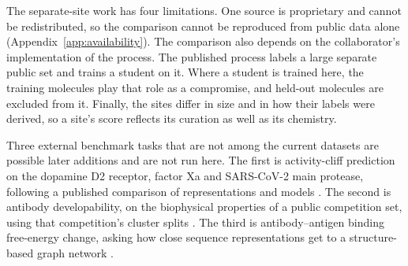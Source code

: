 The separate-site work has four limitations. One source is proprietary and cannot be redistributed, so the comparison cannot be reproduced from public data alone (Appendix~\ref{app:availability}). The comparison also depends on the collaborator's implementation of the process. The published process labels a large separate public set and trains a student on it. Where a student is trained here, the training molecules play that role as a compromise, and held-out molecules are excluded from it. Finally, the sites differ in size and in how their labels were derived, so a site's score reflects its curation as well as its chemistry.

Three external benchmark tasks that are not among the current datasets are possible later additions and are not run here. The first is activity-cliff prediction on the dopamine D2 receptor, factor Xa and SARS-CoV-2 main protease, following a published comparison of representations and models \citep{Dablander2023}. The second is antibody developability, on the biophysical properties of a public competition set, using that competition's cluster splits \citep{vanNiekerk2026}. The third is antibody--antigen binding free-energy change, asking how close sequence representations get to a structure-based graph network \citep{Hummer2025}.


